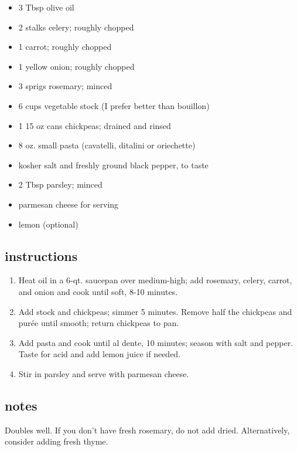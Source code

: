 \documentclass[]{book}
\providecommand{\tightlist}{%
  \setlength{\itemsep}{0pt}\setlength{\parskip}{0pt}}
\begin{document}
\begin{itemize}
\tightlist
\item
  3 Tbsp olive oil
\item
  2 stalks celery; roughly chopped
\item
  1 carrot; roughly chopped
\item
  1 yellow onion; roughly chopped
\item
  3 sprigs rosemary; minced
\item
  6 cups vegetable stock (I prefer better than bouillon)
\item
  1 15 oz cans chickpeas; drained and rinsed
\item
  8 oz. small pasta (cavatelli, ditalini or oriechette)
\item
  kosher salt and freshly ground black pepper, to taste
\item
  2 Tbsp parsley; minced
\item
  parmesan cheese for serving
\item
  lemon (optional)
\end{itemize}

\hypertarget{instructions-13}{%
\subsection{instructions}\label{instructions-13}}

\begin{enumerate}
\def\labelenumi{\arabic{enumi}.}
\tightlist
\item
  Heat oil in a 6-qt. saucepan over medium-high; add rosemary, celery, carrot, and onion and cook until soft, 8-10 minutes.
\item
  Add stock and chickpeas; simmer 5 minutes. Remove half the chickpeas and purée until smooth; return chickpeas to pan.
\item
  Add pasta and cook until al dente, 10 minutes; season with salt and pepper. Taste for acid and add lemon juice if needed.
\item
  Stir in parsley and serve with parmesan cheese.
\end{enumerate}

\hypertarget{notes-13}{%
\subsection{notes}\label{notes-13}}

Doubles well. If you don't have fresh rosemary, do not add dried. Alternatively, consider adding fresh thyme.
\end{document}
